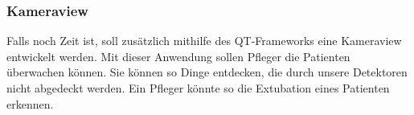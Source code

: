 \subsubsection{Kameraview}
Falls noch Zeit ist, soll zusätzlich mithilfe des QT-Frameworks eine Kameraview entwickelt werden. Mit dieser Anwendung sollen  Pfleger die Patienten überwachen können. Sie können so Dinge entdecken, die durch unsere Detektoren nicht abgedeckt werden. Ein Pfleger könnte so die Extubation eines Patienten erkennen. 
